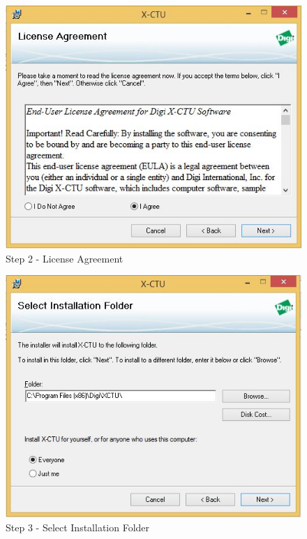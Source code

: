\begin{flushleft}
\begin{figure}
\begin{center}
\includegraphics[scale=0.5]{zigbee_2}
\end{center}
\caption{Step 2 - License Agreement}
\label{zstep2}
\end{figure}
\medskip

\begin{figure}
\begin{center}
\includegraphics[scale=0.5]{zigbee_3}
\end{center}
\caption{Step 3 - Select Installation Folder}
\label{zstep3}
\end{figure}
\medskip


\end{flushleft}

